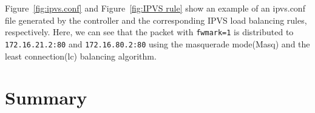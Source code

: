 Figure~\ref{fig:ipvs.conf} and Figure~\ref{fig:IPVS rule} show an example of an ipvs.conf file 
generated by the controller and the corresponding IPVS load balancing rules, respectively.
Here, we can see that the packet with {\tt fwmark=1}\cite{BertHubert2002} is distributed 
to {\tt 172.16.21.2:80} and {\tt 172.16.80.2:80} 
using the masquerade mode(Masq) and 
the least connection(lc)\cite{Zhang2000} balancing algorithm.



\section{Summary}
